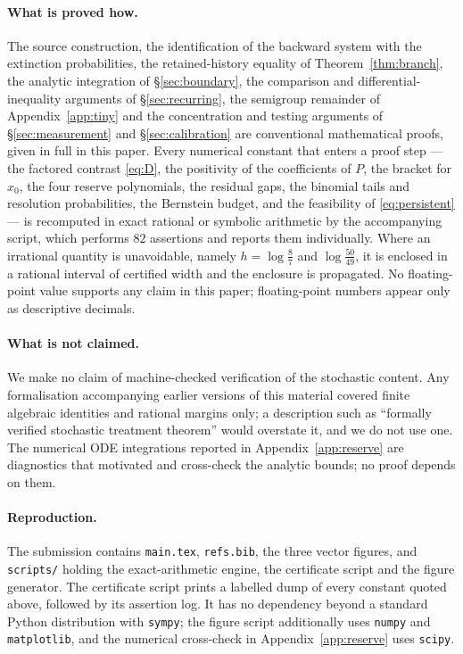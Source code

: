 \documentclass[11pt]{article}
\theoremstyle{plain}
\theoremstyle{definition}
\theoremstyle{remark}
\begin{document}
\paragraph{What is proved how.} The source construction, the identification of
the backward system with the extinction probabilities, the retained-history
equality of Theorem~\ref{thm:branch}, the analytic integration of
\S\ref{sec:boundary}, the comparison and differential-inequality arguments of
\S\ref{sec:recurring}, the semigroup remainder of Appendix~\ref{app:tiny} and
the concentration and testing arguments of \S\ref{sec:measurement} and
\S\ref{sec:calibration} are conventional mathematical proofs, given in full in
this paper. Every numerical constant that enters a proof step --- the factored
contrast \eqref{eq:D}, the positivity of the coefficients of $P$, the bracket
for $x_0$, the four reserve polynomials, the residual gaps, the binomial tails
and resolution probabilities, the Bernstein budget, and the feasibility of
\eqref{eq:persistent} --- is recomputed in exact rational or symbolic
arithmetic by the accompanying script, which performs $82$ assertions and
reports them individually. Where an irrational quantity is unavoidable, namely
$h=\log\frac87$ and $\log\frac{50}{49}$, it is enclosed in a rational interval
of certified width and the enclosure is propagated. No floating-point value
supports any claim in this paper; floating-point numbers appear only as
descriptive decimals.

\paragraph{What is not claimed.} We make no claim of machine-checked
verification of the stochastic content. Any formalisation accompanying earlier
versions of this material covered finite algebraic identities and rational
margins only; a description such as ``formally verified stochastic treatment
theorem'' would overstate it, and we do not use one. The numerical ODE
integrations reported in Appendix~\ref{app:reserve} are diagnostics that
motivated and cross-check the analytic bounds; no proof depends on them.

\paragraph{Reproduction.} The submission contains \texttt{main.tex},
\texttt{refs.bib}, the three vector figures, and \texttt{scripts/} holding the
exact-arithmetic engine, the certificate script and the figure generator. The
certificate script prints a labelled dump of every constant quoted above,
followed by its assertion log. It has no dependency beyond a standard Python
distribution with \texttt{sympy}; the figure script additionally uses
\texttt{numpy} and \texttt{matplotlib}, and the numerical cross-check in
Appendix~\ref{app:reserve} uses \texttt{scipy}.
\end{document}
